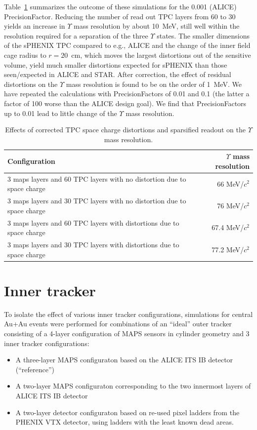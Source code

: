 Table~\ref{tab:upsilon_mass_resolution} summarizes the outcome of these simulations for the 0.001 (ALICE) PrecisionFactor. Reducing the number of 
read out TPC layers from 60 to 30 yields an increase in $\Upsilon$ mass resolution by about 10~MeV, still well within the resolution required
for a separation of the three $\Upsilon$ states. The smaller dimensions of the sPHENIX TPC compared to e.g., ALICE and the change of the inner
field cage radius to $r = 20$~cm, which moves the largest distortions out of the sensitive volume, yield much smaller distortions expected
for sPHENIX than those seen/expected in ALICE and STAR. After correction, the effect of residual distortions on the $\Upsilon$ mass resolution is 
found to be on the order of 1~MeV. We have repeated the calculations with PrecisionFactors of 0.01 and 0.1 (the latter a factor of 100 worse
than the ALICE design goal). We find that PrecisionFactors up to 0.01 lead to little change of the $\Upsilon$ mass resolution. 

\begin{table}
  \centering
  \begin{tabular}{lr}
    \toprule
    Configuration & $\Upsilon$ mass resolution \\
    \midrule
3 maps layers and 60 TPC layers with no distortion due to space charge
&  66 MeV/$c^2$ \\
3 maps layers and 30 TPC layers with no distortion due to space charge
& 76 MeV/$c^2$ \\
3 maps layers and 60 TPC layers with distortions due to space charge
& 67.4 MeV/$c^2$ \\
3 maps layers and 30 TPC layers with distortions due to space charge
& 77.2 MeV/$c^2$ \\
    \bottomrule
  \end{tabular}
  \caption{Effects of corrected TPC space charge distortions and sparsified readout on the $\Upsilon$ mass resolution.}
  \label{tab:upsilon_mass_resolution}
\end{table}



\section{Inner tracker}
\label{sec:innertracker}

To isolate the effect of various inner tracker configurations,
simulations for central Au+Au \hijing events were performed for
combinations of an ``ideal'' outer tracker consisting of a 4-layer
configuration of MAPS sensors in cylinder geometry and 3 inner tracker
configurations:
\begin{itemize}
\item A three-layer MAPS configuraton based on the ALICE ITS IB
  detector (``reference'')
\item A two-layer MAPS configuraton corresponding to the two innermost
  layers of ALICE ITS IB detector
\item A two-layer detector configuraton based on re-used pixel ladders
  from the PHENIX VTX detector, using ladders with the least known
  dead areas.
\end{itemize}


